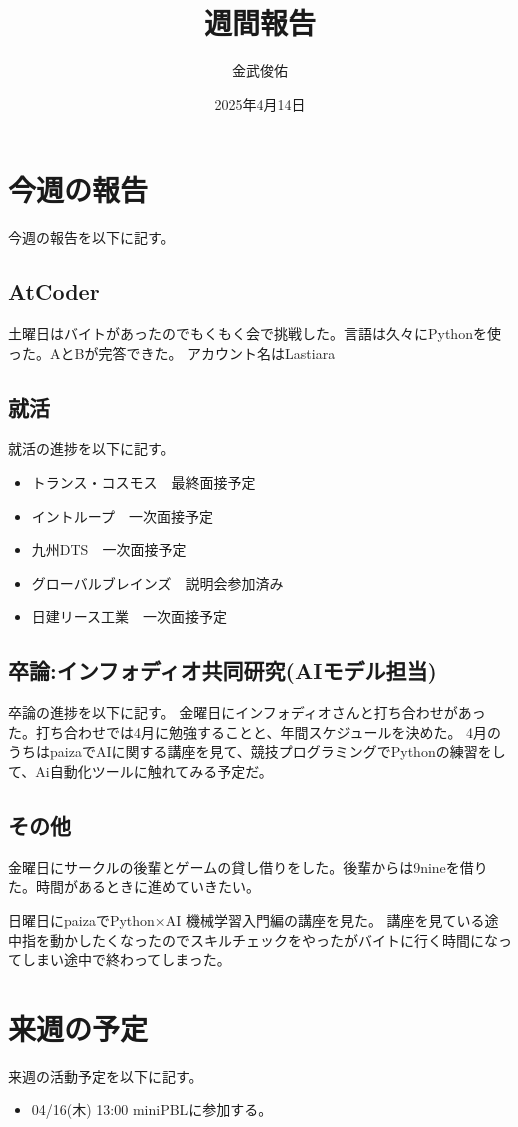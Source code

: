 \documentclass[a4paper,12pt]{ujarticle}
\title{週間報告}
\author{金武俊佑}
\date{2025年4月14日}
\begin{document}
\maketitle

\section{今週の報告}\label{sec:thisweek}
今週の報告を以下に記す。
\subsection{AtCoder}\label{sec:atcoder}
土曜日はバイトがあったのでもくもく会で挑戦した。言語は久々にPythonを使った。AとBが完答できた。
アカウント名はLastiara
\subsection{就活}\label{sec:job}
就活の進捗を以下に記す。
\begin{itemize}
  \item トランス・コスモス　最終面接予定
  \item イントループ　一次面接予定
  \item 九州DTS　一次面接予定
  \item グローバルブレインズ　説明会参加済み
  \item 日建リース工業　一次面接予定
\end{itemize}
\subsection{卒論:インフォディオ共同研究(AIモデル担当)}\label{sec:thesis}
卒論の進捗を以下に記す。
金曜日にインフォディオさんと打ち合わせがあった。打ち合わせでは4月に勉強することと、年間スケジュールを決めた。
4月のうちはpaizaでAIに関する講座を見て、競技プログラミングでPythonの練習をして、Ai自動化ツールに触れてみる予定だ。
\subsection{その他}\label{sec:other}
金曜日にサークルの後輩とゲームの貸し借りをした。後輩からは9nineを借りた。時間があるときに進めていきたい。


日曜日にpaizaでPython×AI 機械学習入門編の講座を見た。
講座を見ている途中指を動かしたくなったのでスキルチェックをやったがバイトに行く時間になってしまい途中で終わってしまった。
\section{来週の予定}\label{sec:nextweek}
来週の活動予定を以下に記す。
\begin{itemize}
  \item 04/16(木) 13:00 miniPBLに参加する。
\end{itemize}
\end{document}
